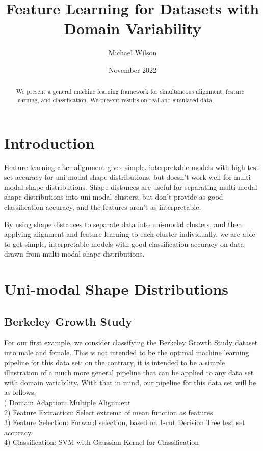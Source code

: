 \documentclass[]{article}
\title{Feature Learning for Datasets with Domain Variability}
\author{Michael Wilson}
\date{November 2022}
\begin{document}
\maketitle

\begin{abstract}
We present a general machine learning framework for simultaneous alignment, feature learning, and classification. We present results on real and simulated data.  
\end{abstract}

\section{Introduction}

Feature learning after alignment gives simple, interpretable models with high test set accuracy for uni-modal shape distributions, but doesn't work well for multi-modal shape distributions. Shape distances are useful for separating multi-modal shape distributions into uni-modal clusters, but don't provide as good classification accuracy, and the features aren't as interpretable. 

By using shape distances to separate data into uni-modal clusters, and then applying alignment and feature learning to each cluster individually, we are able to get simple, interpretable models with good classification accuracy on data drawn from multi-modal shape distributions. 

\section{Uni-modal Shape Distributions}

\subsection{Berkeley Growth Study}

For our first example, we consider classifying the Berkeley Growth Study dataset into male and female. This is not intended to be the optimal machine learning pipeline for this data set; on the contrary, it is intended to be a simple illustration of a much more general pipeline that can be applied to any data set with domain variability. With that in mind, our pipeline for this data set will be as follows;\\

) Domain Adaption: Multiple Alignment\\
2) Feature Extraction: Select extrema of mean function as features\\
3) Feature Selection: Forward selection, based on 1-cut Decision Tree test set accuracy\\
4) Classification: SVM with Gaussian Kernel for Classification\\
\end{document}
